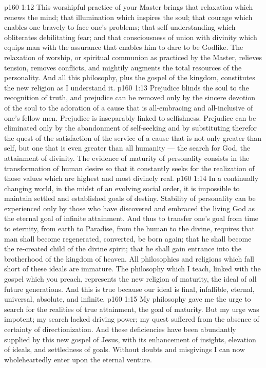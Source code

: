 \vs p160 1:12 This worshipful practice of your Master brings that relaxation which renews the mind; that illumination which inspires the soul; that courage which enables one bravely to face one’s problems; that self\hyp{}understanding which obliterates debilitating fear; and that consciousness of union with divinity which equips man with the assurance that enables him to dare to be Godlike. The relaxation of worship, or spiritual communion as practiced by the Master, relieves tension, removes conflicts, and mightily augments the total resources of the personality. And all this philosophy, plus the gospel of the kingdom, constitutes the new religion as I understand it.
\vs p160 1:13 \pc Prejudice blinds the soul to the recognition of truth, and prejudice can be removed only by the sincere devotion of the soul to the adoration of a cause that is all\hyp{}embracing and all\hyp{}inclusive of one’s fellow men. Prejudice is inseparably linked to selfishness. Prejudice can be eliminated only by the abandonment of self\hyp{}seeking and by substituting therefor the quest of the satisfaction of the service of a cause that is not only greater than self, but one that is even greater than all humanity --- the search for God, the attainment of divinity. The evidence of maturity of personality consists in the transformation of human desire so that it constantly seeks for the realization of those values which are highest and most divinely real.
\vs p160 1:14 In a continually changing world, in the midst of an evolving social order, it is impossible to maintain settled and established goals of destiny. Stability of personality can be experienced only by those who have discovered and embraced the living God as the eternal goal of infinite attainment. And thus to transfer one’s goal from time to eternity, from earth to Paradise, from the human to the divine, requires that man shall become regenerated, converted, be born again; that he shall become the re\hyp{}created child of the divine spirit; that he shall gain entrance into the brotherhood of the kingdom of heaven. All philosophies and religions which fall short of these ideals are immature. The philosophy which I teach, linked with the gospel which you preach, represents the new religion of maturity, the ideal of all future generations. And this is true because our ideal is final, infallible, eternal, universal, absolute, and infinite.
\vs p160 1:15 My philosophy gave me the urge to search for the realities of true attainment, the goal of maturity. But my urge was impotent; my search lacked driving power; my quest suffered from the absence of certainty of directionization. And these deficiencies have been abundantly supplied by this new gospel of Jesus, with its enhancement of insights, elevation of ideals, and settledness of goals. Without doubts and misgivings I can now wholeheartedly enter upon the eternal venture.
